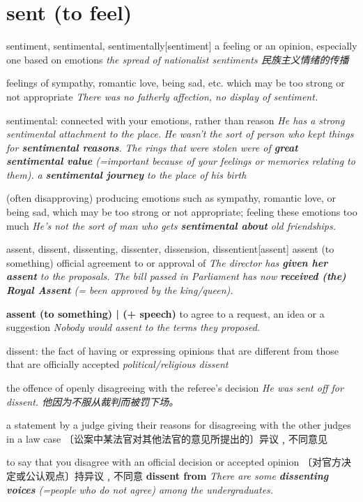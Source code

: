 \section{sent (to feel)}

\begin{DefWord}{sentiment, sentimental, sentimentally}[sentiment]
    a feeling or an opinion, especially one based on emotions
    \textit{the spread of nationalist sentiments 民族主义情绪的传播}

    feelings of sympathy, romantic love, being sad, etc. which may be too strong or not appropriate
    \textit{There was no fatherly affection, no display of sentiment.}

    sentimental: connected with your emotions, rather than reason
    \textit{He has a strong sentimental attachment to the place.}
    \textit{He wasn’t the sort of person who kept things for \textbf{sentimental reasons}.}
    \textit{The rings that were stolen were of \textbf{great sentimental value} (=important because of your feelings or memories relating to them).}
    \textit{a \textbf{sentimental journey} to the place of his birth}

    (often disapproving) producing emotions such as sympathy, romantic love, or being sad, which may be too strong or not appropriate; feeling these emotions too much
    \textit{He's not the sort of man who gets \textbf{sentimental about} old friendships.}
\end{DefWord}

\begin{DefWord}{assent, dissent, dissenting, dissenter, dissension, dissentient}[assent]
    assent (to something) official agreement to or approval of 
    \textit{The director has \textbf{given her assent} to the proposals.}
    \textit{The bill passed in Parliament has now \textbf{received (the) Royal Assent} (= been approved by the king/queen).}

    \textbf{assent (to something) | (+ speech)} to agree to a request, an idea or a suggestion
    \textit{Nobody would assent to the terms they proposed.}

    dissent: the fact of having or expressing opinions that are different from those that are officially accepted
    \textit{political/religious dissent}

    the offence of openly disagreeing with the referee's decision
    \textit{He was sent off for dissent. 他因为不服从裁判而被罚下场。}

    a statement by a judge giving their reasons for disagreeing with the other judges in a law case 〔讼案中某法官对其他法官的意见所提出的〕异议﹐不同意见

    to say that you disagree with an official decision or accepted opinion  〔对官方决定或公认观点〕持异议﹐不同意
    \textbf{dissent from} \textit{There are some \textbf{dissenting voices} (=people who do not agree) among the undergraduates.}
\end{DefWord}

